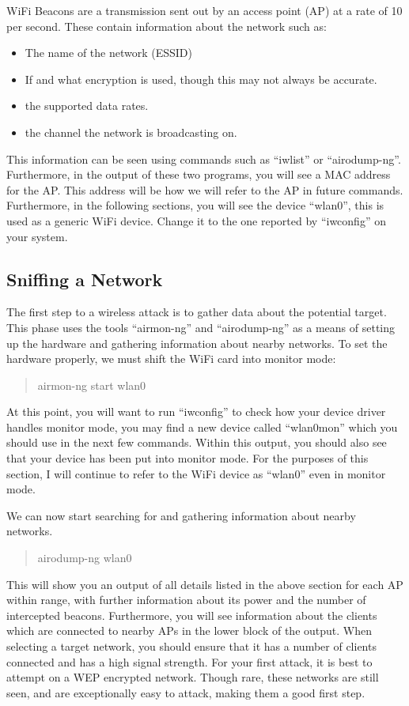 \documentclass[a4paper,11pt]{report}
\begin{document}
			WiFi Beacons are a transmission sent out by an access point (AP) at a rate of 10 per second. 
			These contain information about the network such as:
			\begin{itemize}
				\item The name of the network (ESSID)
				\item If and what encryption is used, though this may not always be accurate. 
				\item the supported data rates. 
				\item the channel the network is broadcasting on. 
			\end{itemize}
			This information can be seen using commands such as ``iwlist'' or ``airodump-ng''.
			Furthermore, in the output of these two programs, you will see a MAC address for the AP. 
			This address will be how we will refer to the AP in future commands. 
			Furthermore, in the following sections, you will see the device ``wlan0'', this is used as a generic WiFi device. 
			Change it to the one reported by ``iwconfig'' on your system. 
		\subsection{Sniffing a Network}
			The first step to a wireless attack is to gather data about the potential target. 
			This phase uses the tools ``airmon-ng'' and ``airodump-ng'' as a means of setting up the hardware and gathering information about nearby networks. 
			To set the hardware properly, we must shift the WiFi card into monitor mode:
			\begin{quote}
				airmon-ng start wlan0
			\end{quote}
			At this point, you will want to run ``iwconfig'' to check how your device driver handles monitor mode, you may find a new device called ``wlan0mon'' which you should use in the next few commands. 
			Within this output, you should also see that your device has been put into monitor mode. 
			For the purposes of this section, I will continue to refer to the WiFi device as ``wlan0'' even in monitor mode. 

			We can now start searching for and gathering information about nearby networks. 
			\begin{quote}
				airodump-ng wlan0
			\end{quote}
			This will show you an output of all details listed in the above section for each AP within range, with further information about its power and the number of intercepted beacons. 
			Furthermore, you will see information about the clients which are connected to nearby APs in the lower block of the output. 
			When selecting a target network, you should ensure that it has a number of clients connected and has a high signal strength. 
			For your first attack, it is best to attempt on a WEP encrypted network. 
			Though rare, these networks are still seen, and are exceptionally easy to attack, making them a good first step. 
\end{document}
